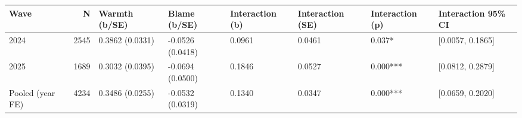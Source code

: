 
\begin{tabular}[t]{lrllllll}
\toprule
Wave & N & Warmth (b/SE) & Blame (b/SE) & Interaction (b) & Interaction (SE) & Interaction (p) & Interaction 95\% CI\\
\midrule
2024 & 2545 & 0.3862 (0.0331) & -0.0526 (0.0418) & 0.0961 & 0.0461 & 0.037* & {}[0.0057, 0.1865]\\
2025 & 1689 & 0.3032 (0.0395) & -0.0694 (0.0500) & 0.1846 & 0.0527 & 0.000*** & {}[0.0812, 0.2879]\\
Pooled (year FE) & 4234 & 0.3486 (0.0255) & -0.0532 (0.0319) & 0.1340 & 0.0347 & 0.000*** & {}[0.0659, 0.2020]\\
\bottomrule
\end{tabular}
